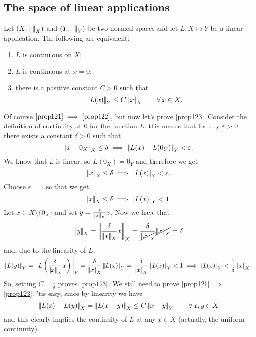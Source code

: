 \documentclass{article}
\begin{document}
\subsection{The space of linear applications}
\begin{proposition}
	Let $(X,\left|\negthinspace\left|\cdot\right|\negthinspace\right|_X)$ and $(Y,\left|\negthinspace\left|\cdot\right|\negthinspace\right|_Y)$ be two normed spaces and let $L;X\mapsto Y$ be a linear application. The following are equivalent:
	\begin{enumerate}[\circnum]
		\item\label{prop121}$L$ is continuous on $X$;
		\item \label{prop122}$L$ is continuous at $x=0$;
		\item\label{prop123}there is a positive constant $C>0$ such that
		\[
		\left|\negthinspace\left|L(x)\right|\negthinspace\right|_Y\leq C\left|\negthinspace\left|x\right|\negthinspace\right|_X\qquad\forall\, x\in X.
		\]
	\end{enumerate}
\end{proposition} 
\begin{fancyproof}
	Of course $\ref{prop121}\implies\ref{prop122}$, but now let's prove \ref{prop123}. Consider the definition of continuity at 0 for the function $L$: this means that for any $\varepsilon>
	0$ there exists a constant $\delta>0$ such that
	\[
	\left|\negthinspace\left|x-0_X\right|\negthinspace\right|_X\leq\delta\implies\left|\negthinspace\left|L(x)-L(0_Y)\right|\negthinspace\right|_Y<\varepsilon.
	\]
	We know that $L$ is linear, so $L(0_X)=0_Y$ and therefore we get
	\begin{equation*}
		\left|\negthinspace\left|x\right|\negthinspace\right|_X\leq\delta\implies\left|\negthinspace\left|L(x)\right|\negthinspace\right|_Y<\varepsilon.
	\end{equation*}
	Choose $\epsilon=1$ so that we get 
	\begin{equation*}
		\left|\negthinspace\left|x\right|\negthinspace\right|_X\leq\delta\implies\left|\negthinspace\left|L(x)\right|\negthinspace\right|_Y<1.
	\end{equation*}
	Let $x\in X\setminus\{0_X\}$ and set $y=\frac{\delta}{\left|\negthinspace\left|x\right|\negthinspace\right|_X}x$. Now we have that
	\begin{equation*}
		\norm{y}_X=\norm{\frac{\delta}{\norm{x}_X}x}_{X}=\frac{\delta}{\cancel{\norm{x}_X}}\cancel{\norm{x}_X}=\delta
	\end{equation*}
	and, due to the linearity of $L$,
	\begin{equation*}
		\norm{L(y)}_Y=\norm{L\left(\frac{\delta}{\norm{x}_X}x\right)}_Y=\frac{\delta}{\norm{x}_X}\norm{L(x)}_Y=\frac{\delta}{\norm{x}_X}\norm{L(x)}_Y<1\implies\norm{L(x)}_Y<\frac{1}{\delta}\norm{x}_X.
	\end{equation*}
	So, setting $C=\frac{1}{\delta}$ proves $\ref{prop123}$. We still need to prove \ref{prop121}$\implies$\ref{prop123}: 'tis easy, since by linearity we have
	\begin{equation*}
		\left|\negthinspace\left|L(x)-L(y)\right|\negthinspace\right|_{X}=\left|\negthinspace\left|L(x-y)\right|\negthinspace\right|_X\leq C\left|\negthinspace\left|x-y\right|\negthinspace\right|_Y\qquad\forall\, x,y\in X
	\end{equation*}
	and this clearly implies the continuity of $L$ at any $x\in X$ (actually, the uniform continuity).
\end{fancyproof}
\end{document}
